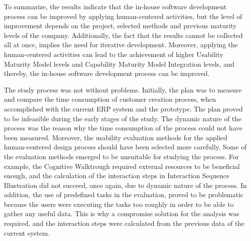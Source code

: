\documentclass[12pt,a4paper,oneside,pdftex]{report}
\begin{document}
To summarize, the results indicate that the in-house software development process can be improved by applying human-centered activities, but the level of improvement depends on the project, selected methods and previous maturity levels of the company. Additionally, the fact that the results cannot be collected all at once, implies the need for iterative development. Moreover, applying the human-centered activities can lead to the achievement of higher Usability Maturity Model levels and Capability Maturity Model Integration levels, and thereby, the in-house software development process can be improved.   

The study process was not without problems. Initially, the plan was to measure and compare the time consumption of customer creation process, when accomplished with the current ERP system and the prototype. The plan proved to be infeasible during the early stages of the study. The dynamic nature of the process was the reason why the time consumption of the process could not have been measured. Moreover, the usability evaluation methods for the applied human-centered design process should have been selected more carefully. 
Some of the evaluation methods emerged to be unsuitable for studying the process. For example, the Cognitive Walktrough required external resources to be beneficial enough, and the calculation of the interaction steps in Interaction Sequence Illustration did not succeed, once again, due to dynamic  nature of the process. In addition, the use of predefined tasks in the evaluation, proved to be problematic because the users were executing the tasks too roughly in order to be able to gather any useful data. This is why a compromise solution for the analysis was required, and the interaction steps were calculated from the previous data of the current system. 
\end{document}
